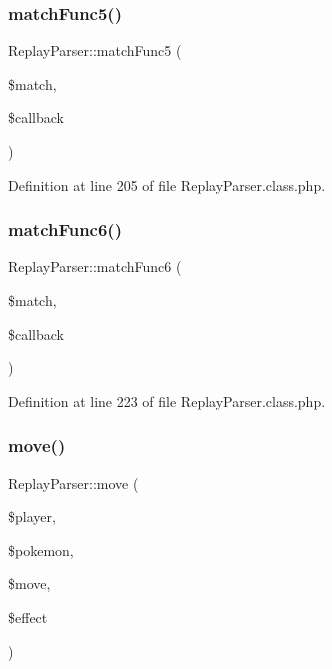 \subsubsection{\texorpdfstring{match\+Func5()}{matchFunc5()}}
{\footnotesize\ttfamily Replay\+Parser\+::match\+Func5 (\begin{DoxyParamCaption}\item[{}]{\$match,  }\item[{}]{\$callback }\end{DoxyParamCaption})}



Definition at line 205 of file Replay\+Parser.\+class.\+php.

\mbox{\label{class_replay_parser_ab7384088b81560523345788ccfcc18b7}} 
\subsubsection{\texorpdfstring{match\+Func6()}{matchFunc6()}}
{\footnotesize\ttfamily Replay\+Parser\+::match\+Func6 (\begin{DoxyParamCaption}\item[{}]{\$match,  }\item[{}]{\$callback }\end{DoxyParamCaption})}



Definition at line 223 of file Replay\+Parser.\+class.\+php.

\mbox{\label{class_replay_parser_af8789f1b8220b77c6054efba8fa84c7a}} 
\subsubsection{\texorpdfstring{move()}{move()}}
{\footnotesize\ttfamily Replay\+Parser\+::move (\begin{DoxyParamCaption}\item[{}]{\$player,  }\item[{}]{\$pokemon,  }\item[{}]{\$move,  }\item[{}]{\$effect }\end{DoxyParamCaption})}



